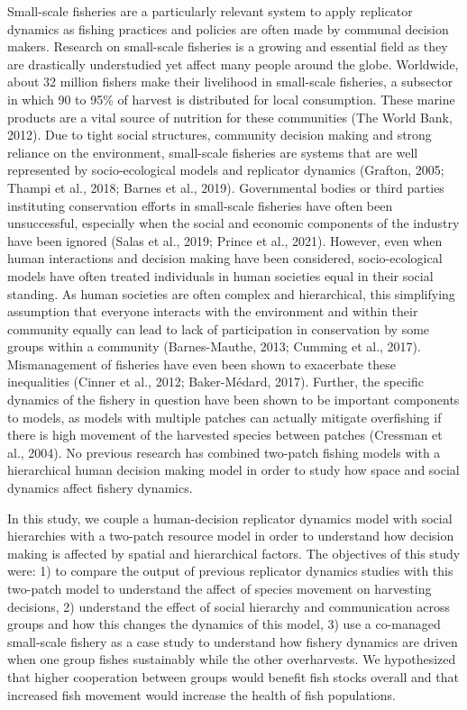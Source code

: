 \documentclass[
  12pt,
]{article}
\begin{document}
Small-scale fisheries are a particularly relevant system to apply replicator dynamics as fishing practices and policies are often made by communal decision makers. Research on small-scale fisheries is a growing and essential field as they are drastically understudied yet affect many people around the globe. Worldwide, about 32 million fishers make their livelihood in small-scale fisheries, a subsector in which 90 to 95\% of harvest is distributed for local consumption. These marine products are a vital source of nutrition for these communities (The World Bank, 2012). Due to tight social structures, community decision making and strong reliance on the environment, small-scale fisheries are systems that are well represented by socio-ecological models and replicator dynamics (Grafton, 2005; Thampi et al., 2018; Barnes et al., 2019). Governmental bodies or third parties instituting conservation efforts in small-scale fisheries have often been unsuccessful, especially when the social and economic components of the industry have been ignored (Salas et al., 2019; Prince et al., 2021). However, even when human interactions and decision making have been considered, socio-ecological models have often treated individuals in human societies equal in their social standing. As human societies are often complex and hierarchical, this simplifying assumption that everyone interacts with the environment and within their community equally can lead to lack of participation in conservation by some groups within a community (Barnes-Mauthe, 2013; Cumming et al., 2017). Mismanagement of fisheries have even been shown to exacerbate these inequalities (Cinner et al., 2012; Baker-Médard, 2017). Further, the specific dynamics of the fishery in question have been shown to be important components to models, as models with multiple patches can actually mitigate overfishing if there is high movement of the harvested species between patches (Cressman et al., 2004). No previous research has combined two-patch fishing models with a hierarchical human decision making model in order to study how space and social dynamics affect fishery dynamics.

In this study, we couple a human-decision replicator dynamics model with social hierarchies with a two-patch resource model in order to understand how decision making is affected by spatial and hierarchical factors. The objectives of this study were: 1) to compare the output of previous replicator dynamics studies with this two-patch model to understand the affect of species movement on harvesting decisions, 2) understand the effect of social hierarchy and communication across groups and how this changes the dynamics of this model, 3) use a co-managed small-scale fishery as a case study to understand how fishery dynamics are driven when one group fishes sustainably while the other overharvests. We hypothesized that higher cooperation between groups would benefit fish stocks overall and that increased fish movement would increase the health of fish populations.
\end{document}
